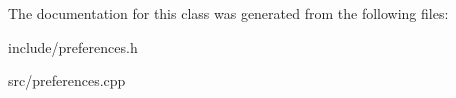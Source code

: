 The documentation for this class was generated from the following files\+:\begin{DoxyCompactItemize}
\item 
include/preferences.\+h\item 
src/preferences.\+cpp\end{DoxyCompactItemize}

